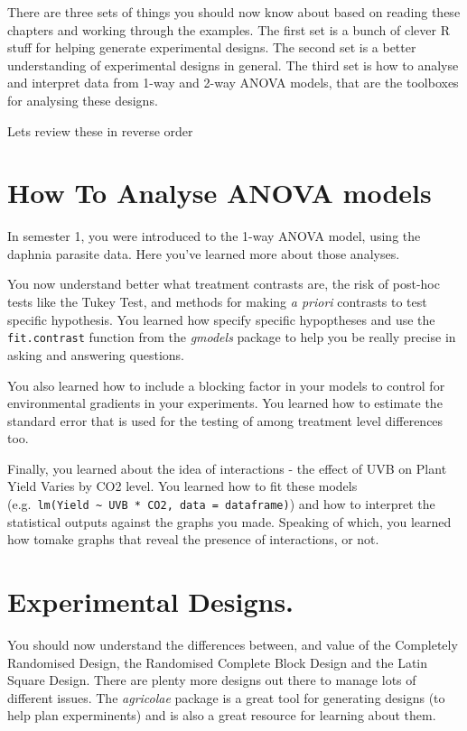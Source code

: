 \documentclass[
]{book}
\begin{document}
There are three sets of things you should now know about based on reading these chapters and working through the examples. The first set is a bunch of clever R stuff for helping generate experimental designs. The second set is a better understanding of experimental designs in general. The third set is how to analyse and interpret data from 1-way and 2-way ANOVA models, that are the toolboxes for analysing these designs.

Lets review these in reverse order

\hypertarget{how-to-analyse-anova-models}{%
\section{How To Analyse ANOVA models}\label{how-to-analyse-anova-models}}

In semester 1, you were introduced to the 1-way ANOVA model, using the daphnia parasite data. Here you've learned more about those analyses.

You now understand better what treatment contrasts are, the risk of post-hoc tests like the Tukey Test, and methods for making \emph{a priori} contrasts to test specific hypothesis. You learned how specify specific hypoptheses and use the \texttt{fit.contrast} function from the \emph{gmodels} package to help you be really precise in asking and answering questions.

You also learned how to include a blocking factor in your models to control for environmental gradients in your experiments. You learned how to estimate the standard error that is used for the testing of among treatment level differences too.

Finally, you learned about the idea of interactions - the effect of UVB on Plant Yield Varies by CO2 level. You learned how to fit these models (e.g.~\texttt{lm(Yield\ \textasciitilde{}\ UVB\ *\ CO2,\ data\ =\ dataframe)}) and how to interpret the statistical outputs against the graphs you made. Speaking of which, you learned how tomake graphs that reveal the presence of interactions, or not.

\hypertarget{experimental-designs.}{%
\section{Experimental Designs.}\label{experimental-designs.}}

You should now understand the differences between, and value of the Completely Randomised Design, the Randomised Complete Block Design and the Latin Square Design. There are plenty more designs out there to manage lots of different issues. The \emph{agricolae} package is a great tool for generating designs (to help plan experminents) and is also a great resource for learning about them.
\end{document}
